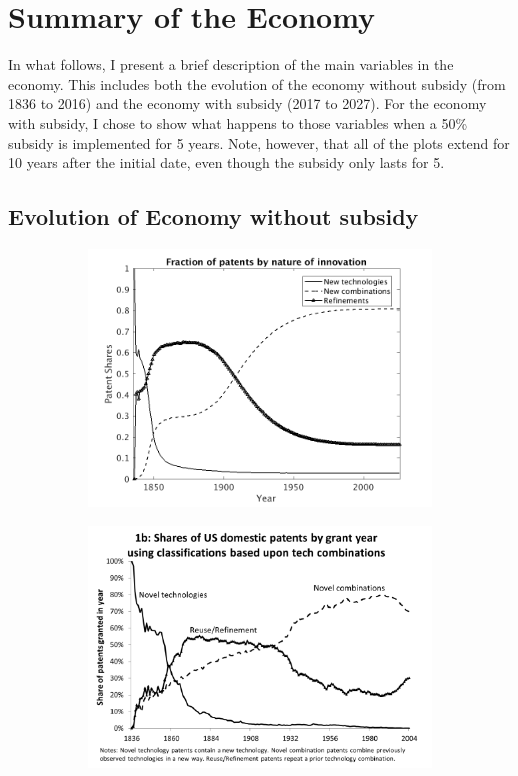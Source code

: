 \documentclass[serif]{article}
\theoremstyle{definition}
\begin{document}
\section{Summary of the Economy}

In what follows, I present a brief description of the main variables in the economy. This includes both the evolution of the economy without subsidy (from 1836 to 2016) and the economy with subsidy (2017 to 2027). For the economy with subsidy, I chose to show what happens to those variables when a 50\% subsidy is implemented for 5 years. Note, however, that all of the plots extend for 10 years after the initial date, even though the subsidy only lasts for 5.

\subsection{Evolution of Economy without subsidy}

\begin{figure}[h!]
\begin{subfigure}[b]{0.45\textwidth}
\includegraphics[width=\textwidth]{figures/5_years/patents.png}
\end{subfigure}
\begin{subfigure}[b]{0.45\textwidth}
\includegraphics[width=\textwidth]{figures/patents_data.png}
\end{subfigure}
\end{figure}
\end{document}
